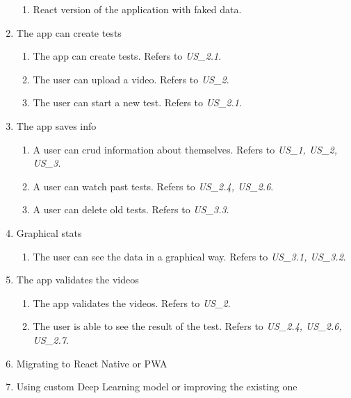 \begin{enumerate}[label=\textbf{MIL\_\arabic*}, align=left, leftmargin=*]
\begin{enumerate}[label=\textbf{\theenumi.\arabic*}, align=left, leftmargin=*]
            \item React version of the application with faked data.
        \end{enumerate}
    \item The app can create tests
        \begin{enumerate}[label=\textbf{\theenumi.\arabic*}, align=left, leftmargin=*]
            \item The app can create tests. Refers to \textit{US\_2.1}.
            \item The user can upload a video. Refers to \textit{US\_2}.
            \item The user can start a new test. Refers to \textit{US\_2.1}.
        \end{enumerate}
    \item The app saves info
        \begin{enumerate}[label=\textbf{\theenumi.\arabic*}, align=left, leftmargin=*]
            \item A user can crud information about themselves. Refers to \textit{US\_1, US\_2, US\_3}.
            \item A user can watch past tests. Refers to \textit{US\_2.4, US\_2.6}.
            \item A user can delete old tests. Refers to \textit{US\_3.3}.
        \end{enumerate}
    \item Graphical stats
        \begin{enumerate}[label=\textbf{\theenumi.\arabic*}, align=left, leftmargin=*]
            \item The user can see the data in a graphical way. Refers to \textit{US\_3.1, US\_3.2}.
        \end{enumerate}
    \item The app validates the videos
        \begin{enumerate}[label=\textbf{\theenumi.\arabic*}, align=left, leftmargin=*]
            \item The app validates the videos. Refers to \textit{US\_2}.
            \item The user is able to see the result of the test.  Refers to \textit{US\_2.4, US\_2.6, US\_2.7}.
        \end{enumerate}
    \item Migrating to React Native or PWA
    \item Using custom Deep Learning model or improving the existing one
\end{enumerate}
  
